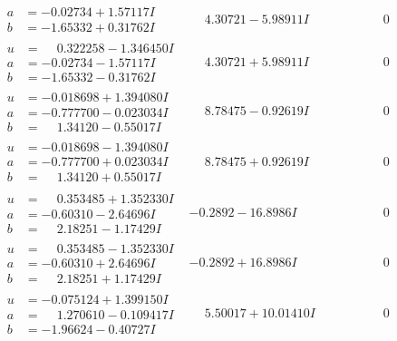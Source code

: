 \documentclass[1p]{elsarticle_modified}
\theoremstyle{definition}
\begin{document}
$$\begin{array}{c|c|c}
\begin{aligned}
a &= -0.02734 + 1.57117 I \\
b &= -1.65332 + 0.31762 I\end{aligned}
 & \phantom{-}4.30721 - 5.98911 I & \phantom{-0.000000 } 0 \\ \hline\begin{aligned}
u &= \phantom{-}0.322258 - 1.346450 I \\
a &= -0.02734 - 1.57117 I \\
b &= -1.65332 - 0.31762 I\end{aligned}
 & \phantom{-}4.30721 + 5.98911 I & \phantom{-0.000000 } 0 \\ \hline\begin{aligned}
u &= -0.018698 + 1.394080 I \\
a &= -0.777700 - 0.023034 I \\
b &= \phantom{-}1.34120 - 0.55017 I\end{aligned}
 & \phantom{-}8.78475 - 0.92619 I & \phantom{-0.000000 } 0 \\ \hline\begin{aligned}
u &= -0.018698 - 1.394080 I \\
a &= -0.777700 + 0.023034 I \\
b &= \phantom{-}1.34120 + 0.55017 I\end{aligned}
 & \phantom{-}8.78475 + 0.92619 I & \phantom{-0.000000 } 0 \\ \hline\begin{aligned}
u &= \phantom{-}0.353485 + 1.352330 I \\
a &= -0.60310 - 2.64696 I \\
b &= \phantom{-}2.18251 - 1.17429 I\end{aligned}
 & -0.2892 - 16.8986 I & \phantom{-0.000000 } 0 \\ \hline\begin{aligned}
u &= \phantom{-}0.353485 - 1.352330 I \\
a &= -0.60310 + 2.64696 I \\
b &= \phantom{-}2.18251 + 1.17429 I\end{aligned}
 & -0.2892 + 16.8986 I & \phantom{-0.000000 } 0 \\ \hline\begin{aligned}
u &= -0.075124 + 1.399150 I \\
a &= \phantom{-}1.270610 - 0.109417 I \\
b &= -1.96624 - 0.40727 I\end{aligned}
 & \phantom{-}5.50017 + 10.01410 I & \phantom{-0.000000 } 0 \\ \hline\begin{aligned}

\end{aligned}
\end{array}$$
\end{document}
